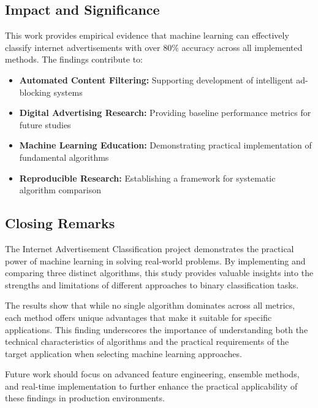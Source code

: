 \subsection{Impact and Significance}

This work provides empirical evidence that machine learning can effectively classify internet advertisements with over 80\% accuracy across all implemented methods. The findings contribute to:

\begin{itemize}
    \item \textbf{Automated Content Filtering:} Supporting development of intelligent ad-blocking systems
    \item \textbf{Digital Advertising Research:} Providing baseline performance metrics for future studies
    \item \textbf{Machine Learning Education:} Demonstrating practical implementation of fundamental algorithms
    \item \textbf{Reproducible Research:} Establishing a framework for systematic algorithm comparison
\end{itemize}

\subsection{Closing Remarks}

The Internet Advertisement Classification project demonstrates the practical power of machine learning in solving real-world problems. By implementing and comparing three distinct algorithms, this study provides valuable insights into the strengths and limitations of different approaches to binary classification tasks.

The results show that while no single algorithm dominates across all metrics, each method offers unique advantages that make it suitable for specific applications. This finding underscores the importance of understanding both the technical characteristics of algorithms and the practical requirements of the target application when selecting machine learning approaches.

Future work should focus on advanced feature engineering, ensemble methods, and real-time implementation to further enhance the practical applicability of these findings in production environments.